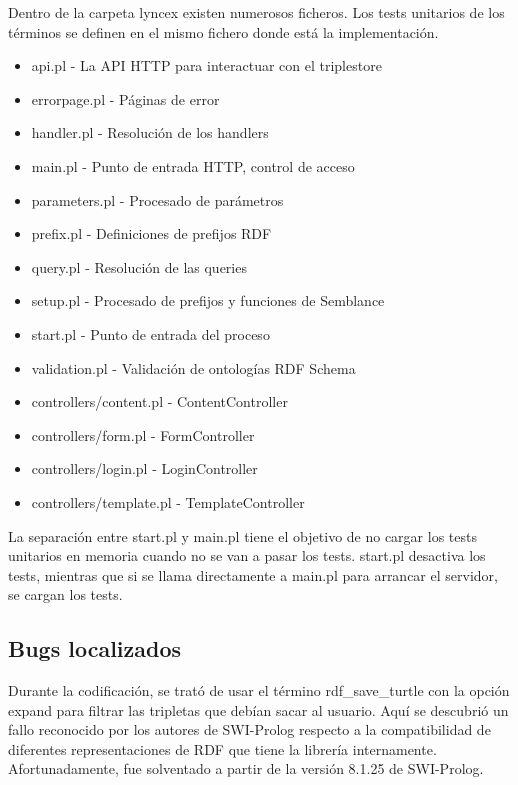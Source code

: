 \documentclass[12pt]{report} %
\begin{document}
Dentro de la carpeta lyncex existen numerosos ficheros. Los tests unitarios de los términos se definen en el mismo fichero donde está la implementación.

\begin{itemize}
    \item api.pl - La API HTTP para interactuar con el triplestore
    \item errorpage.pl - Páginas de error
    \item handler.pl - Resolución de los handlers
    \item main.pl - Punto de entrada HTTP, control de acceso
    \item parameters.pl - Procesado de parámetros
    \item prefix.pl - Definiciones de prefijos RDF
    \item query.pl - Resolución de las queries
    \item setup.pl - Procesado de prefijos y funciones de Semblance
    \item start.pl - Punto de entrada del proceso
    \item validation.pl - Validación de ontologías RDF Schema
    \item controllers/content.pl - ContentController
    \item controllers/form.pl - FormController
    \item controllers/login.pl - LoginController
    \item controllers/template.pl - TemplateController
\end{itemize}

La separación entre start.pl y main.pl tiene el objetivo de no cargar los tests unitarios en memoria cuando no se van a pasar los tests. start.pl desactiva los tests, mientras que si se llama directamente a main.pl para arrancar el servidor, se cargan los tests.

\subsection{Bugs localizados}

Durante la codificación, se trató de usar el término rdf\_save\_turtle con la opción expand para filtrar las tripletas que debían sacar al usuario. Aquí se descubrió un fallo reconocido por los autores de SWI-Prolog respecto a la compatibilidad de diferentes representaciones de RDF que tiene la librería internamente. Afortunadamente, fue solventado a partir de la versión 8.1.25 de SWI-Prolog.\cite{bug}
\end{document}
